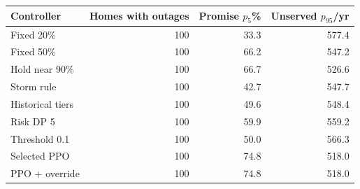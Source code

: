 \begin{tabular}{lrrr}
\toprule
Controller & Homes with outages & Promise $p_5$\% & Unserved $p_{95}$/yr \\
\midrule
Fixed 20\% & 100 & 33.3 & 577.4 \\
Fixed 50\% & 100 & 66.2 & 547.2 \\
Hold near 90\% & 100 & 66.7 & 526.6 \\
Storm rule & 100 & 42.7 & 547.7 \\
Historical tiers & 100 & 49.6 & 548.4 \\
Risk DP 5 & 100 & 59.9 & 559.2 \\
Threshold 0.1 & 100 & 50.0 & 566.3 \\
Selected PPO & 100 & 74.8 & 518.0 \\
PPO + override & 100 & 74.8 & 518.0 \\
\bottomrule
\end{tabular}
